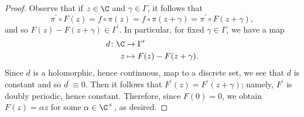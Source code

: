 \documentclass[10pt]{amsart}
\begin{document}
\begin{thm}
\begin{proof}
    Observe that if $z \in \C$ and $\gamma \in \Gamma$, it follows that
    $$\pi^\prime \circ F(z) = f \circ \pi(z) = f \circ \pi(z + \gamma) = \pi^\prime \circ F(z + \gamma),$$
    and so $F(z) - F(z + \gamma) \in \Gamma^\prime$.
    In particular, for fixed $\gamma \in \Gamma$, we have a map 
    \begin{align*}
      d \colon \C &\rightarrow \Gamma^\prime\\
      z &\mapsto F(z) - F(z + \gamma).
    \end{align*}
    Since $d$ is a holomorphic, hence continuous, map to a discrete set, we see that $d$ is constant and so $d^\prime \equiv 0$.
    Then it follows that $F^\prime(z) = F^\prime(z + \gamma)$; namely, $F^\prime$ is doubly periodic, hence constant.
    Therefore, since $F(0) = 0$, we obtain $F(z) = \alpha z$ for some $\alpha \in \C^\times$, as desired.
  \end{proof}
\end{thm}
\end{document}
